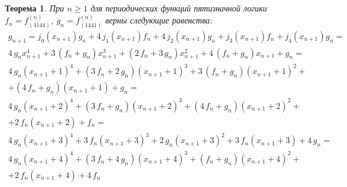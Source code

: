 \documentclass[bibliography=totoc, a4paper, 14pt]{extarticle}
\newtheorem{myth}{Теорема}
\begin{document}
\begin{myth} При $n \geqslant 1 $ для периодических функций пятизначной логики $f_n = f^{\left(n\right)}_{\left(1144\right)}$,
$g_n = f^{\left(n\right)}_{\left(1441\right)}$ верны следующие равенства:
$$\begin{array}{l}
 g_{n+1} = j_0(x_{n+1})g_n + 4\,j_1(x_{n+1})f_n + 4\,j_2(x_{n+1})g_n + j_3(x_{n+1})f_n + j_4(x_{n+1})g_n=\\
4 \, g_{n} x_{n+1}^{4} + 3 \, {\left(f_{n} + g_{n}\right)} x_{n+1}^{3} + {\left(2 \, f_{n} + 3 \, g_{n}\right)} x_{n+1}^{2} + 4 \, {\left(f_{n} + g_{n}\right)} x_{n+1} + g_{n}=\\
4 \, g_{n} {\left(x_{n+1} + 1\right)}^{4} + {\left(3 \, f_{n} + 2 \, g_{n}\right)} {\left(x_{n+1} + 1\right)}^{3} + 3 \, {\left(f_{n} + g_{n}\right)} {\left(x_{n+1} + 1\right)}^{2} + \\
 + {\left(4 \, f_{n} + g_{n}\right)} {\left(x_{n+1} + 1\right)} + g_{n}=\\
4 \, g_{n} {\left(x_{n+1} + 2\right)}^{4} + {\left(3 \, f_{n} + g_{n}\right)} {\left(x_{n+1} + 2\right)}^{3} + {\left(4 \, f_{n} + g_{n}\right)} {\left(x_{n+1} + 2\right)}^{2} + \\
 + 2 \, f_{n} {\left(x_{n+1} + 2\right)} + f_{n}=\\
4 \, g_{n} {\left(x_{n+1} + 3\right)}^{4} + 3 \, f_{n} {\left(x_{n+1} + 3\right)}^{3} + 2 \, g_{n} {\left(x_{n+1} + 3\right)}^{2} + 3 \, f_{n} {\left(x_{n+1} + 3\right)} + 4 \, g_{n}=\\
4 \, g_{n} {\left(x_{n+1} + 4\right)}^{4} + {\left(3 \, f_{n} + 4 \, g_{n}\right)} {\left(x_{n+1} + 4\right)}^{3} + {\left(f_{n} + g_{n}\right)} {\left(x_{n+1} + 4\right)}^{2} + \\
+ 2 \, f_{n} {\left(x_{n+1} + 4\right)} + 4 \, f_{n}\\
\end{array}$$
\end{myth}
\end{document}
